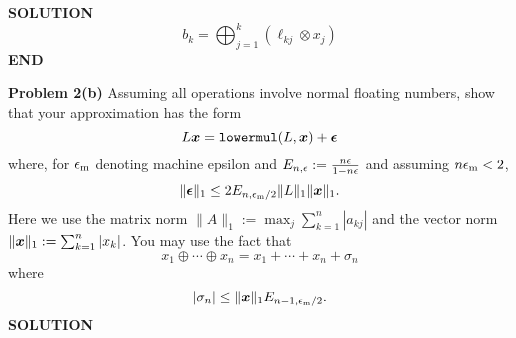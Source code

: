 \documentclass[12pt,a4paper]{article}
\def\x{ {\vc x} }
\begin{document}
\textbf{SOLUTION}
\[
b_k = \ensuremath{\bigoplus}_{j=1}^k (\ensuremath{\ell}_{kj} \ensuremath{\otimes} x_j)
\]
\textbf{END}

\textbf{Problem 2(b)} Assuming all operations involve normal floating numbers, show that your approximation has the form
\[
L \ensuremath{\bm{\x}} = {\tt lowermul}(L, \ensuremath{\bm{\x}}) + \ensuremath{\bm{\epsilon}}
\]
where, for $\ensuremath{\epsilon}_{\rm m}$ denoting machine epsilon and $E_{n,\ensuremath{\epsilon}}:= {n \ensuremath{\epsilon} \over 1-n\ensuremath{\epsilon}}$ and assuming $n \ensuremath{\epsilon}_{\rm m} < 2$,
\[
\| \ensuremath{\bm{\epsilon}} \|_1 \ensuremath{\leq}   2E_{n,\ensuremath{\epsilon}_{\rm m}/2}   \|L\|_1 \| \ensuremath{\bm{\x}} \|_1.
\]
Here we use  the matrix norm $\| A \|_1 := \max_j \ensuremath{\sum}_{k=1}^n |a_{kj}|$ and the vector norm $\| \ensuremath{\bm{\x}} \|_1 := \ensuremath{\sum}_{k=1}^n |x_k|$. You may use the fact that
\[
x_1 \ensuremath{\oplus} \ensuremath{\cdots} \ensuremath{\oplus} x_n = x_1 +  \ensuremath{\cdots} + x_n + \ensuremath{\sigma}_n
\]
where
\[
|\ensuremath{\sigma}_n| \ensuremath{\leq} \| \ensuremath{\bm{\x}} \|_1 E_{n-1,\ensuremath{\epsilon}_{\rm m}/2}.
\]
\textbf{SOLUTION}
\end{document}
